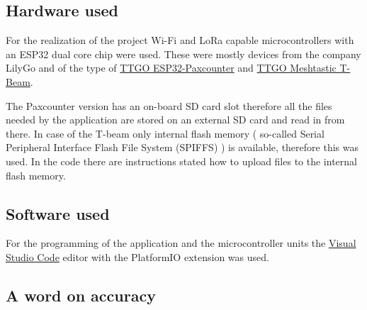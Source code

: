 \documentclass[11pt,a4paper]{article}
\begin{document}
\subsection{Hardware used}

For the realization of the project Wi-Fi and LoRa capable microcontrollers with an ESP32 dual core chip were used. These were mostly devices from the company LilyGo and of the type of \href{https://www.aliexpress.com/item/32915894264.html?spm=a2g0o.detail.1000060.2.43398dd6jrQzfD&gps-id=pcDetailBottomMoreThisSeller&scm=1007.13339.169870.0&scm_id=1007.13339.169870.0&scm-url=1007.13339.169870.0&pvid=7e14ac00-29fd-4fd5-ad6a-08f3264a0d6f&_t=gps-id:pcDetailBottomMoreThisSeller,scm-url:1007.13339.169870.0,pvid:7e14ac00-29fd-4fd5-ad6a-08f3264a0d6f,tpp_buckets:668\%230\%23131923\%2335_668\%23888\%233325\%2314_668\%232846\%238108\%231977_668\%232717\%237567\%23944_668\%231000022185\%231000066059\%230_668\%233468\%2315612\%23323}{TTGO ESP32-Paxcounter}
and 
\href{https://www.aliexpress.com/item/4001178678568.html?spm=a2g0o.detail.100009.5.1bf16608x35S1b&gps-id=pcDetailLeftTopSell&scm=1007.13482.95643.0&scm_id=1007.13482.95643.0&scm-url=1007.13482.95643.0&pvid=8422c7ea-a8d6-46a8-b6ed-1d913000ef9f&_t=gps-id:pcDetailLeftTopSell,scm-url:1007.13482.95643.0,pvid:8422c7ea-a8d6-46a8-b6ed-1d913000ef9f,tpp_buckets:668\%230\%23131923\%231_668\%23808\%234094\%23267_668\%23888\%233325\%238_668\%234328\%2319934\%23620_668\%232846\%238114\%23705_668\%232717\%237563\%23586_668\%231000022185\%231000066058\%230_668\%233480\%2315683\%2363}{TTGO Meshtastic T-Beam}.

The Paxcounter version has an on-board SD card slot therefore all the files needed by the application are stored on an external SD card and read in from there. In case of the T-beam only internal flash memory ( so-called Serial Peripheral Interface Flash File System (SPIFFS) ) is available, therefore this was used. In the code there are instructions stated how to upload files to the internal flash memory.


\subsection{Software used}

For the programming of the application and the microcontroller units the \href{https://docs.platformio.org/en/latest/integration/ide/vscode.html}{Visual Studio Code} editor with the PlatformIO extension was used.


\subsection{A word on accuracy}
\end{document}
